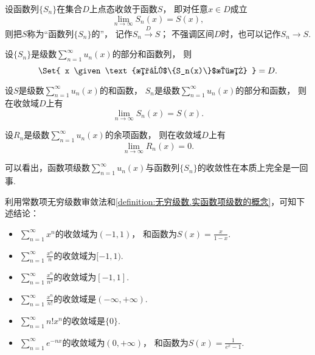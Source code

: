 \begin{definition}
设函数列\(\{S_n\}\)在集合\(D\)上点态收敛于函数\(S\)，
即对任意\(x \in D\)成立\[
	\lim_{n\to\infty} S_n(x) = S(x),
\]
则把\(S\)称为“函数列\(\{S_n\}\)的”，
记作\(S_n \overset{D}\to S\)；
不强调区间\(D\)时，也可以记作\(S_n \to S\).
\end{definition}

\begin{proposition}
设\(\{S_n\}\)是级数\(\sum_{n=1}^\infty u_n(x)\)的部分和函数列，
则\[
	\Set{ x \given \text{数列$\{S_n(x)\}$收敛} } = D.
\]
\end{proposition}
\begin{proposition}
设\(S\)是级数\(\sum_{n=1}^\infty u_n(x)\)的和函数，
\(S_n\)是级数\(\sum_{n=1}^\infty u_n(x)\)的部分和函数，
则在收敛域\(D\)上有\[
	\lim_{n\to\infty} S_n(x) = S(x).
\]
\end{proposition}
\begin{proposition}
设\(R_n\)是级数\(\sum_{n=1}^\infty u_n(x)\)的余项函数，
则在收敛域\(D\)上有\[
	\lim_{n\to\infty} R_n(x) = 0.
\]
\end{proposition}
\begin{remark}
可以看出，函数项级数\(\sum_{n=1}^\infty u_n(x)\)与函数列\(\{S_n\}\)的收敛性在本质上完全是一回事.
\end{remark}

\begin{example}
利用常数项无穷级数审敛法和\cref{definition:无穷级数.实函数项级数的概念}，可知下述结论：
\begin{itemize}
	\item \(\sum_{n=1}^\infty x^n\)的收敛域为\((-1,1)\)，
	和函数为\(S(x) = \frac{x}{1-x}\).
	\item \(\sum_{n=1}^\infty \frac{x^n}{n}\)的收敛域为\([-1,1)\).
	\item \(\sum_{n=1}^\infty \frac{x^n}{n^2}\)的收敛域为\([-1,1]\).
	\item \(\sum_{n=1}^\infty \frac{x^n}{n!}\)的收敛域是\((-\infty,+\infty)\).
	\item \(\sum_{n=1}^\infty n! x^n\)的收敛域是\(\{0\}\).
	\item \(\sum_{n=1}^\infty e^{-nx}\)的收敛域为\((0,+\infty)\)，
	和函数为\(S(x) = \frac1{e^x-1}\).
\end{itemize}
\end{example}

